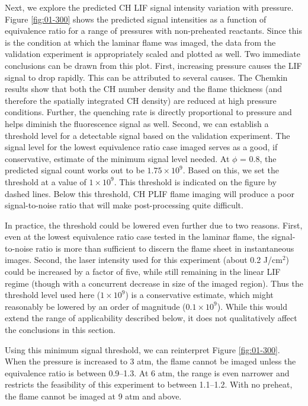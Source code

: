 Next, we explore the predicted CH LIF signal intensity variation with pressure.
Figure \ref{fig:01-300} shows the predicted signal intensities as a function of equivalence ratio for a range of pressures with non-preheated reactants.
Since this is the condition at which the laminar flame was imaged, the data from the validation experiment is appropriately scaled and plotted as well.
Two immediate conclusions can be drawn from this plot.
First, increasing pressure causes the LIF signal to drop rapidly.
This can be attributed to several causes.
The Chemkin results show that both the CH number density and the flame thickness (and therefore the spatially integrated CH density) are reduced at high pressure conditions.
Further, the quenching rate is directly proportional to pressure and helps diminish the fluorescence signal as well.
Second, we can establish a threshold level for a detectable signal based on the validation experiment.
The signal level for the lowest equivalence ratio case imaged serves as a good, if conservative, estimate of the minimum signal level needed.
At \(\phi\) = 0.8, the predicted signal count works out to be \(1.75\times10^9\).
Based on this, we set the threshold at a value of \(1\times10^9\).
This threshold is indicated on the figure by dashed lines.
Below this threshold, CH PLIF flame imaging will produce a poor signal-to-noise ratio that will make post-processing quite difficult.

In practice, the threshold could be lowered even further due to two reasons.
First, even at the lowest equivalence ratio case tested in the laminar flame, the signal-to-noise ratio is more than sufficient to discern the flame sheet in instantaneous images.
Second, the laser intensity used for this experiment (about 0.2 J/cm\(^2\)) could be increased by a factor of five, while still remaining in the linear LIF regime (though with a concurrent decrease in size of the imaged region).
Thus the threshold level used here (\(1\times10^9\)) is a conservative estimate, which might reasonably be lowered by an order of magnitude (\(0.1\times10^9\)). While this would extend the range of applicability described below, it does not qualitatively affect the conclusions in this section.

Using this minimum signal threshold, we can reinterpret Figure \ref{fig:01-300}.
When the pressure is increased to 3 atm, the flame cannot be imaged unless the equivalence ratio is between 0.9--1.3.
At 6 atm, the range is even narrower and restricts the feasibility of this experiment to between 1.1--1.2.
With no preheat, the flame cannot be imaged at 9 atm and above.

